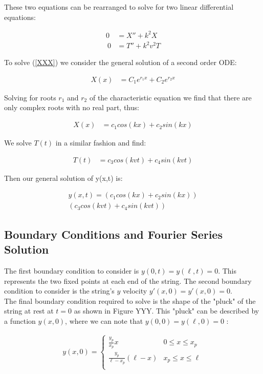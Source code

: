 \documentclass[%
 reprint,
 amsmath,amssymb,
 aps,
]{revtex4-1}
\begin{document}
These two equations can be rearranged to solve for two linear differential equations:

\begin{align}
0 &= X'' + k^2 X \label{XXX}\\\
0 &= T'' + k^2v^2 T \label{YYY}
\end{align}

To solve (\ref{XXX}) we consider the general solution of a second order ODE:

\begin{align}
X(x) &= C_1e^{r_1 x} + C_2e^{r_2 x}
\end{align}

Solving for roots $r_1$ and $r_2$ of the characteristic equation we find that there are only complex roots with no real part, thus:

\begin{align}
X(x) &= c_1 cos(kx) + c_2sin(kx)
\end{align}

We solve $T(t)$ in a similar fashion and find:

\begin{align}
T(t) &= c_3 cos(kvt) + c_4sin(kvt)
\end{align}

Then our general solution of y(x,t) is:

\begin{multline}
y(x,t) =(c_1 cos(kx) + c_2sin(kx))\\(c_3 cos(kvt) + c_4sin(kvt))
\end{multline}

\subsection{\label{sec:level1}Boundary Conditions and Fourier Series Solution}

The first boundary condition to consider is $y(0,t)=y(\ell,t)=0$. This represents the two fixed points at each end of the string. The second boundary condition to consider is the string's $y$ velocity $y'(x,0)=y'(x,0)=0.$\\

The final boundary condition required to solve is the shape of the "pluck" of the string at rest at $t=0$ as shown in Figure YYY. This "pluck" can be described by a function $y(x,0)$, where we can note that $y(0,0)=y(\ell,0)=0$ :

\begin{align} \label{y0}
y(x,0) =  
   \begin{cases} 
      \frac{y_p}{x_p}x & 0 \leq x\leq x_p \\
      \frac{y_p}{\ell-x_p}(\ell-x) & x_p \leq x\leq \ell \\
   \end{cases}
\end{align}
\end{document}
